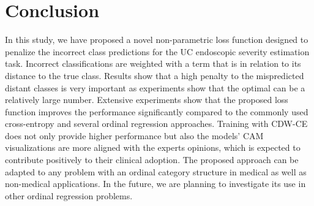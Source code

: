\documentclass[runningheads]{llncs}
\begin{document}
\section{Conclusion}

In this study, we have proposed a novel non-parametric loss function designed to penalize the incorrect class predictions for the UC endoscopic severity estimation task. Incorrect classifications are weighted with a term that is in relation to its distance to the true class. Results show that a high penalty to the mispredicted distant classes is very important as experiments show that the optimal  can be a relatively large number. Extensive experiments show that the proposed loss function improves the performance significantly compared to the commonly used cross-entropy and several ordinal regression approaches. Training with CDW-CE does not only provide higher performance but also the models' CAM visualizations are more aligned with the experts opinions, which is expected to contribute positively to their clinical adoption. The proposed approach can be adapted to any problem with an ordinal category structure in medical as well as non-medical applications. In the future, we are planning to investigate its use in other ordinal regression problems.





\end{document}
